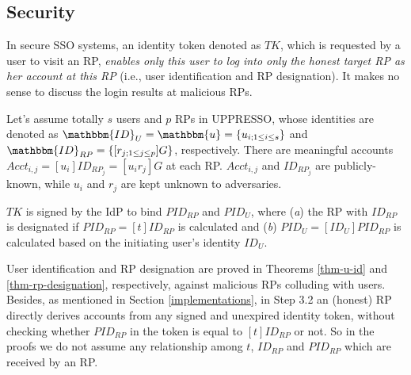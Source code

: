

\subsection{Security}
\label{analysis-security}

In secure SSO systems, an identity token denoted as $TK$, which is requested by a user to visit an RP,
    \emph{enables only this user to log into only the honest target RP as her account at this RP} (i.e., user identification and RP designation). It makes no sense to discuss the login results at malicious RPs.

Let's assume totally $s$ users and $p$ RPs in UPPRESSO,
    whose identities are denoted as $\mathbbm{ID}_U = \mathbbm{u} = \{u_{i; 1 \leq i \leq s}\}$ and $\mathbbm{ID}_{RP} = \{[r_{j;1 \leq j \leq p}]G\}$, respectively.
There are meaningful accounts $Acct_{i,j}=[u_i]ID_{RP_j} = [u_i r_j]G$ at each RP.
$Acct_{i,j}$ and $ID_{RP_j}$ are publicly-known, while $u_{i}$ and $r_{j}$ are kept unknown to adversaries.

$TK$ is signed by the IdP to bind $PID_{RP}$ and $PID_U$,
where (\emph{a}) the RP with $ID_{RP}$ is designated if $PID_{RP} = [t]ID_{RP}$ is calculated
    and (\emph{b}) $PID_U = [ID_U]PID_{RP}$ is calculated based on the initiating user's identity $ID_U$.

User identification and RP designation are proved in Theorems \ref{thm-u-id} and \ref{thm-rp-designation}, respectively, against malicious RPs colluding with users.
Besides, as mentioned in Section \ref{implementations}, 
in Step 3.2 an (honest) RP directly derives accounts from any signed and unexpired identity token, without checking whether $PID_{RP}$ in the token is equal to $[t]ID_{RP}$ or not.
So in the proofs we do not assume any relationship among $t$, $ID_{RP}$ and $PID_{RP}$ which are received by an RP.


